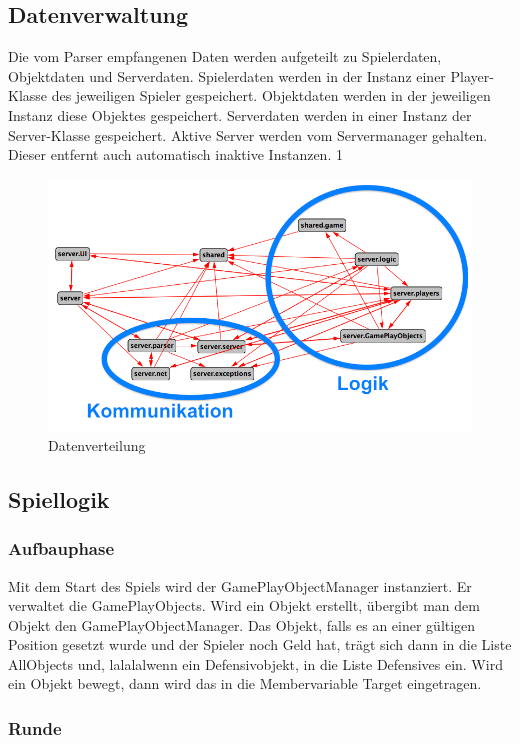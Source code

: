 \documentclass[ngerman, 12pt, pdftex]{scrartcl}[2006/07/30]
\begin{document}
\subsection{Datenverwaltung}
Die vom Parser empfangenen Daten werden aufgeteilt zu Spielerdaten, Objektdaten und Serverdaten.
Spielerdaten werden in der Instanz einer Player-Klasse des jeweiligen Spieler gespeichert. Objektdaten werden in der jeweiligen Instanz diese Objektes gespeichert. Serverdaten werden in einer Instanz der Server-Klasse gespeichert. Aktive Server werden vom Servermanager gehalten. Dieser entfernt auch automatisch inaktive Instanzen. 1
\begin{figure}[h!]
\centering
\includegraphics[width=14cm]{server/server.png}
\caption{Datenverteilung}
\end{figure}

\subsection{Spiellogik}
\subsubsection{Aufbauphase}
Mit dem Start des Spiels wird der GamePlayObjectManager instanziert. Er verwaltet die GamePlayObjects.
Wird ein Objekt erstellt, \"{u}bergibt man dem Objekt den GamePlayObjectManager. Das Objekt, falls es an einer g\"{u}ltigen Position gesetzt wurde und der Spieler noch Geld hat, tr\"{a}gt sich dann in die Liste AllObjects und, lalalalwenn ein Defensivobjekt, in die Liste Defensives ein. Wird ein Objekt bewegt, dann wird das in die Membervariable Target eingetragen.

\subsubsection{Runde}
\end{document}
